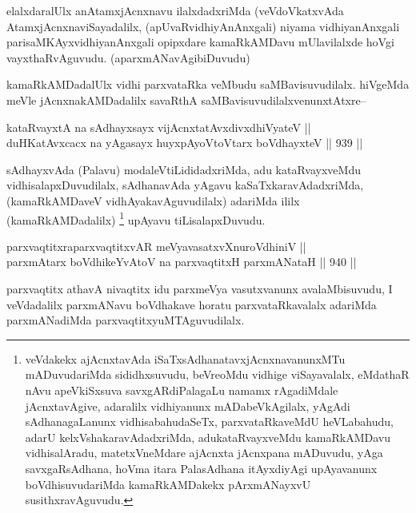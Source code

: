 \begin{artha}
elalxdaralUlx anAtamxjAcnxnavu ilalxdadxriMda (veVdoVkatxvAda AtamxjAcnxnaviSayadalilx, (apUvaRvidhiyAnAnxgali) niyama vidhiyanAnxgali parisaMKAyxvidhiyanAnxgali opipxdare kamaRkAMDavu mUlavilalxde hoVgi vayxthaRvAguvudu. (aparxmANavAgibiDuvudu)
\end{artha}

\begin{artha}
kamaRkAMDadalUlx vidhi parxvataRka veMbudu saMBavisuvudilalx. hiVgeMda meVle jAcnxnakAMDadalilx savaRthA saMBavisuvudilalxvenunxtAtxre--
\end{artha}

\begin{shl}
kataRvayxtA na sAdhayxsayx vijAcnxtatAvxdivxdhiVyateV || \\
duHKatAvxcacx na yAgasayx huyxpAyoV\s toV\s tarx boVdhayxteV \hfill || 939 ||  
\end{shl}

\begin{artha}
sAdhayxvAda (Palavu) modaleVtiLididadxriMda, adu kataRvayxveMdu vidhisalapxDuvudilalx, sAdhanavAda yAgavu kaSaTxkaravAdadxriMda,(kamaRkAMDaveV vidhAyakavAguvudilalx) adariMda ililx (kamaRkAMDadalilx) \footnote{veVdakekx ajAcnxtavAda iSaTxsAdhanatavxjAcnxnavanunxMTu mADuvudariMda sididhxsuvudu, beVreoMdu vidhige viSayavalalx, eMdathaR nAvu apeVkiSxsuva savxgARdiPalagaLu namamx rAgadiMdale jAcnxtavAgive, adaralilx vidhiyanunx mADabeVkAgilalx, yAgAdi sAdhanagaLanunx vidhisabahudaSeTx, parxvataRkaveMdU heVLabahudu, adarU kelxVshakaravAdadxriMda, adukataRvayxveMdu kamaRkAMDavu vidhisalAradu, matetxVneMdare ajAcnxta jAcnxpana mADuvudu, yAga savxgaRsAdhana, hoVma itara PalasAdhana itAyxdiyAgi upAyavanunx boVdhisuvudariMda kamaRkAMDakekx pArxmANayxvU susithxravAguvudu.} upAyavu tiLisalapxDuvudu.
\end{artha}


\begin{shl}
parxvaqtitxraparxvaqtitxvAR meVyavasatxvXnuroVdhiniV || \\
parxmA\s tarx boVdhikeYvAtoV na parxvaqtitxH parxmANataH \hfill || 940 ||  
\end{shl}

\begin{artha}
parxvaqtitx athavA nivaqtitx idu parxmeVya vasutxvanunx avalaMbisuvudu, I veVdadalilx parxmANavu boVdhakave horatu parxvataRkavalalx adariMda parxmANadiMda parxvaqtitxyuMTAguvudilalx.
\end{artha}

